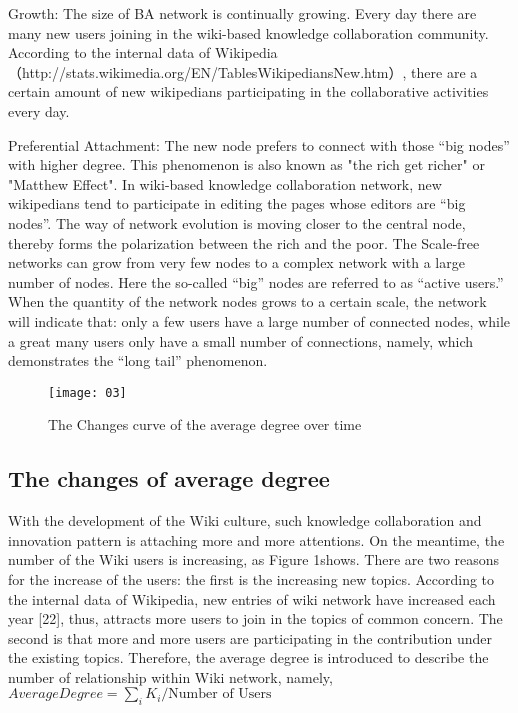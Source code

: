 \documentclass{elsarticle}
\begin{document}
Growth: The size of BA network is continually growing. Every day there
are many new users joining in the wiki-based knowledge collaboration
community. According to the internal data of
Wikipedia（http://stats.wikimedia.org/EN/TablesWikipediansNew.htm）,
there are a certain amount of new wikipedians participating in the
collaborative activities every day. 

Preferential Attachment: The new node prefers to connect with those
“big nodes” with higher degree. This phenomenon is also known as "the
rich get richer" or "Matthew Effect". In wiki-based knowledge
collaboration network, new wikipedians tend to participate in editing
the pages whose editors are “big nodes”. The way of network evolution
is moving closer to the central node, thereby forms the polarization
between the rich and the poor. The Scale-free networks can grow from
very few nodes to a complex network with a large number of nodes. Here
the so-called “big” nodes are referred to as “active users.” When the
quantity of the network nodes grows to a certain scale, the network
will indicate that: only a few users have a large number of connected
nodes, while a great many users only have a small number of
connections, namely, which demonstrates the “long tail” phenomenon. 

\begin{figure}[htpb]
  \centering
  \texttt{[image: 03]}
  \caption{The Changes curve of the average degree over time}
\end{figure}

\subsection{The changes of average degree}
\label{sec:chang-aver-degr}

With the development of the Wiki culture, such knowledge collaboration
and innovation pattern is attaching more and more attentions. On the
meantime, the number of the Wiki users is increasing, as Figure
1shows. There are two reasons for the increase of the users: the first
is the increasing new topics. According to the internal data of
Wikipedia, new entries of wiki network have increased each year [22],
thus, attracts more users to join in the topics of common concern. The
second is that more and more users are participating in the
contribution under the existing topics. Therefore, the average degree
is introduced to describe the number of relationship within Wiki
network, namely,$AverageDegree = \sum_iK_i/\text{Number of Users}$
\end{document}
